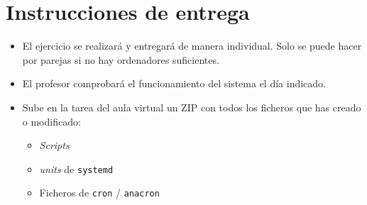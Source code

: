 \documentclass{article}
\begin{document}
\section{Instrucciones de entrega}
\label{sec:org0000012}

\begin{itemize}
\item El ejercicio se realizará y entregará de manera individual. Solo se puede hacer por parejas si no hay ordenadores suficientes.
\item El profesor comprobará el funcionamiento del sistema el día indicado.
\item Sube en la tarea del aula virtual un ZIP con todos los ficheros que has creado o modificado:
\begin{itemize}
\item \emph{Scripts}
\item \emph{units} de \texttt{systemd}
\item Ficheros de \texttt{cron} / \texttt{anacron}
\end{itemize}
\end{itemize}
\end{document}
